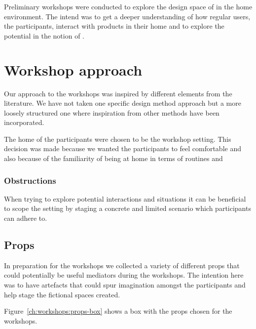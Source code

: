 
Preliminary workshops were conducted to explore the design space of  in the home environment.
The intend was to get a deeper understanding of how regular users, the participants, interact with products in their home and to explore the potential in the notion of .

\section{Workshop approach}
\label{ch:workshops:approach}
Our approach to the workshops was inspired by different elements from the literature. \todo{\dots}
We have not taken one specific design method approach but a more loosely structured one where inspiration from other methods have been incorporated.

The home of the participants were chosen to be the workshop setting.
This decision was made because we wanted the participants to feel comfortable and also because of the familiarity of being at home in terms of routines and 

\subsubsection{Obstructions}
\label{ch:workshops:approach:obstructions}

When trying to explore potential interactions and situations it can be beneficial to scope the setting by staging a concrete and limited scenario which participants can adhere to.







\subsection{Props}
\label{ch:workshops:approach:props}

In preparation for the workshops we collected a variety of different props that could potentially be useful mediators during the workshops.
The intention here was to have artefacts that could spur imagination amongst the participants and help stage the fictional spaces created.

Figure~\ref{ch:workshops:props-box} shows a box with the props chosen for the workshops.

